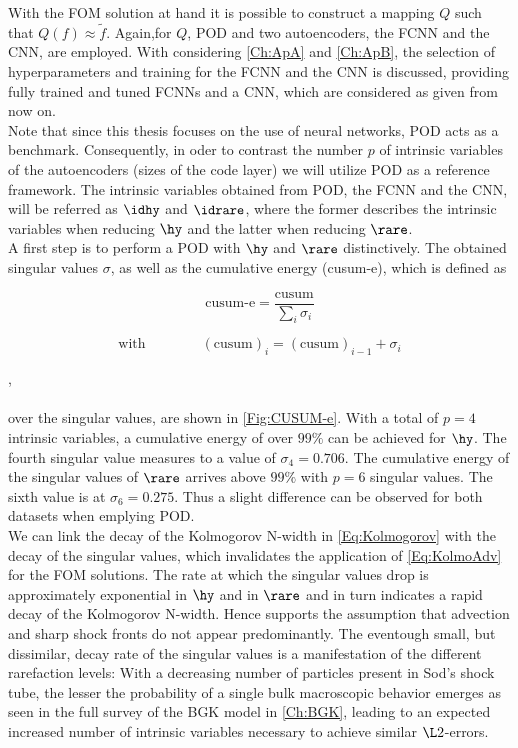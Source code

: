 With the FOM solution at hand it is possible to construct a mapping \(Q\) such that \(Q(f)\approx \tilde{f}\). Again,for \(Q\), POD and two autoencoders, the FCNN and the CNN, are employed. With considering \cref{Ch:ApA} and \cref{Ch:ApB}, the selection of hyperparameters and training for the FCNN and the CNN is discussed, providing fully trained and tuned FCNNs and a CNN, which are considered as given from now on.\\
Note that since this thesis focuses on the use of neural networks, POD acts as a benchmark. Consequently, in oder to contrast the number \(p\) of intrinsic variables of the autoencoders (sizes of the code layer) we will utilize POD as a reference framework. The intrinsic variables obtained from POD, the FCNN and the CNN, will be referred as \(\idhy\) and \(\idrare\), where the former describes the intrinsic variables when reducing \(\hy\) and the latter when reducing \(\rare\).\\
A first step is to perform a POD with \(\hy\) and \(\rare\) distinctively. The obtained singular values \(\sigma\), as well as the cumulative energy (cusum-e), which is defined as\\
\noindent \begin{minipage}{.3\linewidth}
	\begin{equation}
	\textrm{cusum-e} = \frac{\textrm{cusum}}{\sum_i \sigma_i}
	\end{equation}
\end{minipage}%
\begin{minipage}{.7\linewidth}
	\begin{equation}
			\textrm{with} \qquad\qquad(\textrm{cusum})_i =(\text{cusum})_{i-1} + \sigma_{i}
	\end{equation}
\end{minipage},\\\\
over the singular values, are shown in \cref{Fig:CUSUM-e}. With a total of \(p=4\) intrinsic variables, a cumulative energy of over \(99\%\) can be achieved for \(\hy\). The fourth singular value measures to a value of \(\sigma_4 = 0.706\). The cumulative energy of the singular values of \(\rare\) arrives above \(99\%\) with \(p=6\) singular values. The sixth value is at \(\sigma_6 = 0.275\). Thus a slight difference can be observed for both datasets when emplying POD.\\
We can link the decay of the Kolmogorov N-width in \cref{Eq:Kolmogorov} with the decay of the singular values, which invalidates the application of \cref{Eq:KolmoAdv} for the FOM solutions.  The rate at which the singular values drop is approximately exponential in \(\hy\) and in \(\rare\) and in turn indicates a rapid decay of the Kolmogorov N-width. Hence supports the  assumption that advection and sharp shock fronts do not appear predominantly. The eventough small, but dissimilar, decay rate of the singular values is a manifestation of the different rarefaction levels: With a decreasing number of particles present in Sod's shock tube, the lesser the probability of a single bulk macroscopic behavior emerges as seen in the full survey of the BGK model in \cref{Ch:BGK}, leading to an expected increased number of intrinsic variables necessary to achieve similar \(\L2\)-errors.  
